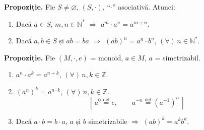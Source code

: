 \documentclass[12pt]{article}
\begin{document}
\noindent\textbf{Propoziție.} Fie $S \neq \varnothing$, $(S,\cdot)$, ``$\cdot$'' asociativă. Atunci:
\begin{enumerate}
\item[(1)] Dacă $a \in S$, $m,n \in \mathbb{N}^*$ $\Rightarrow$ $a^m \cdot a^n = a^{m+n}$.
\item[(2)] Dacă $a,b \in S$ și $ab=ba$ $\Rightarrow$ $(ab)^n = a^n \cdot b^n$, $(\forall)\, n \in \mathbb{N}^*$.
\end{enumerate}

\noindent\textbf{Propoziție.} Fie $(M,\cdot,e)$ = monoid, $a \in M$, $a$ = simetrizabil.
\begin{enumerate}
\item[(1)] $a^n \cdot a^k = a^{n+k}$, $(\forall)\, n,k \in \mathbb{Z}$.
\item[(2)] $(a^n)^k = a^{n\cdot k}$, $(\forall)\, n,k \in \mathbb{Z}$.
\[
\left[\, a^0 \overset{\text{def}}{=} e, \qquad a^{-n} \overset{\text{def}}{=} (a^{-1})^n \,\right]
\]
\item[(3)] Dacă $a\cdot b = b\cdot a$, $a$ și $b$ simetrizabile $\Rightarrow$ $(ab)^k = a^k b^k$.
\end{enumerate}
\end{document}
